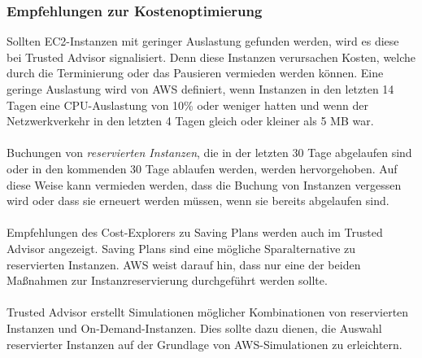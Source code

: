 \subsubsection*{Empfehlungen zur Kostenoptimierung}
Sollten EC2-Instanzen mit geringer Auslastung gefunden werden, wird es diese bei Trusted Advisor signalisiert. Denn diese Instanzen verursachen Kosten, welche durch die Terminierung oder das Pausieren vermieden werden können. Eine geringe Auslastung wird von AWS definiert, wenn Instanzen in den letzten 14 Tagen eine CPU-Auslastung von 10\% oder weniger hatten und wenn der Netzwerkverkehr in den letzten 4 Tagen gleich oder kleiner als 5 MB war. 
\\\\
Buchungen von \textit{reservierten Instanzen}, die in der letzten 30 Tage abgelaufen sind oder in den kommenden 30 Tage ablaufen werden, werden hervorgehoben. Auf diese Weise kann vermieden werden, dass die Buchung von Instanzen vergessen wird oder dass sie erneuert werden müssen, wenn sie bereits abgelaufen sind.
\\\\
Empfehlungen des Cost-Explorers zu Saving Plans werden auch im Trusted Advisor angezeigt. Saving Plans sind eine mögliche Sparalternative zu reservierten Instanzen. AWS weist darauf hin, dass nur eine der beiden Maßnahmen zur Instanzreservierung durchgeführt werden sollte.
\\\\
Trusted Advisor erstellt Simulationen möglicher Kombinationen von reservierten Instanzen und On-Demand-Instanzen. Dies sollte dazu dienen, die Auswahl reservierter Instanzen auf der Grundlage von AWS-Simulationen zu erleichtern.

